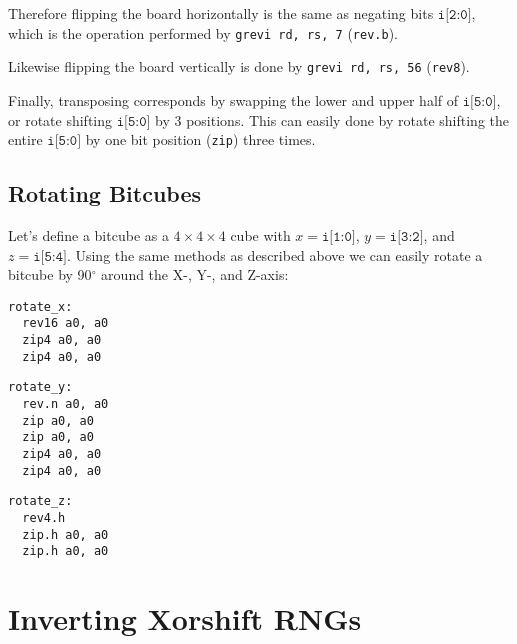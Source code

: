 Therefore flipping the board horizontally is the same as negating bits $\texttt{i[2:0]}$,
which is the operation performed by {\tt grevi rd, rs, 7} ({\tt rev.b}).

Likewise flipping the board vertically is done by {\tt grevi rd, rs, 56} ({\tt rev8}).

Finally, transposing corresponds by swapping the lower and upper half of $\texttt{i[5:0]}$,
or rotate shifting $\texttt{i[5:0]}$ by 3 positions. This can easily done by rotate shifting the entire
$\texttt{i[5:0]}$ by one bit position ({\tt zip}) three times.

\subsection{Rotating Bitcubes}

Let's define a bitcube as a $4 \times 4 \times 4$ cube with $x=\texttt{i[1:0]}$,
$y=\texttt{i[3:2]}$, and $z=\texttt{i[5:4]}$. Using the same methods as described
above we can easily rotate a bitcube by 90$^\circ$ around the X-, Y-, and Z-axis:

\begin{multicols}{3}
\begin{minipage}{\linewidth}
\begin{verbatim}
rotate_x:
  rev16 a0, a0
  zip4 a0, a0
  zip4 a0, a0
\end{verbatim}
\end{minipage}

\begin{minipage}{\linewidth}
\begin{verbatim}
rotate_y:
  rev.n a0, a0
  zip a0, a0
  zip a0, a0
  zip4 a0, a0
  zip4 a0, a0
\end{verbatim}
\end{minipage}

\begin{minipage}{\linewidth}
\begin{verbatim}
rotate_z:
  rev4.h
  zip.h a0, a0
  zip.h a0, a0
\end{verbatim}
\end{minipage}
\end{multicols}


\section{Inverting Xorshift RNGs}

